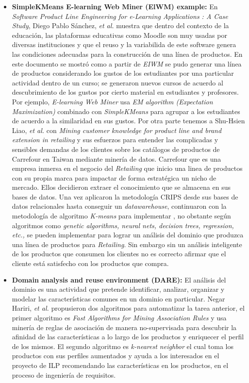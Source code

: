 \begin{itemize}
\item {\textbf{SimpleKMeans E-learning Web Miner (ElWM) example:}}
En \textit{Software Product Line Engineering for e-Learning Applications : A Case Study}\cite{Pablo2012}, Diego Pablo Sánchez, \textit{et al.} muestra que dentro del contexto de la educación, las plataformas educativas como Moodle son muy usadas por diversas instituciones y que el reuso y la variabilida de este software genera las condiciones adecuadas para la construcción de una línea de productos. En este documento se mostró como a partir de \textit{EIWM} se pudo generar una línea de productos considerando los gustos de los estudiantes por una particular actividad dentro de un curso; se generaron nuevos cursos de acuerdo al descubrimiento de los gustos por cierto material en estudiantes y profesores. Por ejemplo, \textit{E-learning Web Miner} usa \textit{EM algorithm (Expectation Maximization)} combinado con \textit{SimpleKMeans} para agrupar a los estudiantes de acuerdo a la similaridad en sus gustos.
Por otra parte tenemos a Shu-Hsien Liao, \textit{et al.} con \textit{Mining customer knowledge for product line and brand extension in retailing}\cite{Liao2008} y sus esfuerzos para entender las complicadas y sensibles demandas de los clientes sobre los catálogos de productos de Carrefour en Taiwan mediante minería de datos. Carrefour que es una empresa inmersa en el negocio del \textit{Retailing} que inicio una linea de productos con su propia marca para impactar de forma estratégica un nicho de mercado. Ellos decidieron extraer el conocimiento que se almacena en sus bases de datos. Una vez aplicaron la metodología CRIPS desde sus bases de datos relacionales hasta conseguir un \textit{datawarehouse}, continuaron con la metodología de algoritmo \textit{K-means} para implementar , no obstante según  \cite{Liao2008}  algoritmos como \textit{genetic algorithms, neural nets, decision trees, regression, etc.,} se pueden implementar para lograr un análisis del dominio que produzca una línea de productos para \textit{Retailing}. Sin embargo sin un análisis inteligente de los productos que consumen los clientes no es correcto afirmar que el cliente está satisfecho con los productos que compra.

\item {\textbf{Domain analysis and reuse environment (DARE):}}
El análisis del dominio es una actividad que pretende identificar, analizar, organizar y modelar las características comunes en un dominio en particular. Negar Hariri, \textit{et al.}\cite{Hariri2013} propusieron dos algoritmos para automatizar la tarea anterior, el primer algoritmo es \textit{Fast Algorithms for Mining Association Rules} y usa minería de reglas de asociación de manera no-supervisada para descubrir la afinidad de las características a lo largo de los productos y enriquecer el perfil de los mismos. El segundo algoritmo es \textit{k-nearest neighbor} el cual toma los productos con sus perfiles aumentados y ayuda a los interesados en el proyecto de ILP recomendando las características en  los productos, en el proceso de ingeniería de requisitos.


\end{itemize}
